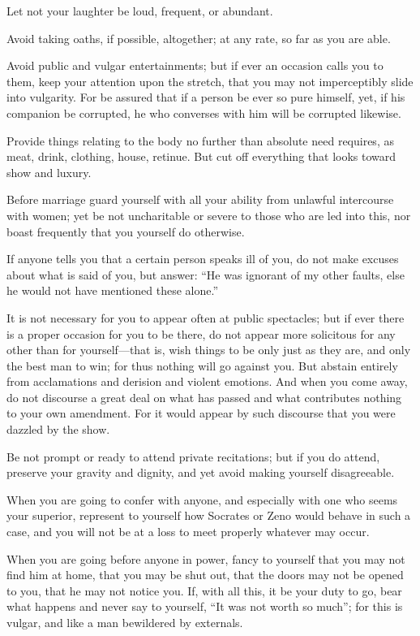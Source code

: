 \documentclass[11pt]{article}
\begin{document}
Let not your laughter be loud, frequent, or abundant.

Avoid taking oaths, if possible, altogether; at any rate, so far as you are able.

Avoid public and vulgar entertainments; but if ever an occasion calls you to them, keep your attention upon the stretch, that you may not imperceptibly slide into vulgarity. For be assured that if a person be ever so pure himself, yet, if his companion be corrupted, he who converses with him will be corrupted likewise.

Provide things relating to the body no further than absolute need requires, as meat, drink, clothing, house, retinue. But cut off everything that looks toward show and luxury.

Before marriage guard yourself with all your ability from unlawful intercourse with women; yet be not uncharitable or severe to those who are led into this, nor boast frequently that you yourself do otherwise.

If anyone tells you that a certain person speaks ill of you, do not make excuses about what is said of you, but answer: “He was ignorant of my other faults, else he would not have mentioned these alone.”

It is not necessary for you to appear often at public spectacles; but if ever there is a proper occasion for you to be there, do not appear more solicitous for any other than for yourself—that is, wish things to be only just as they are, and only the best man to win; for thus nothing will go against you. But abstain entirely from acclamations and derision and violent emotions. And when you come away, do not discourse a great deal on what has passed and what contributes nothing to your own amendment. For it would appear by such discourse that you were dazzled by the show.

Be not prompt or ready to attend private recitations; but if you do attend, preserve your gravity and dignity, and yet avoid making yourself disagreeable.

When you are going to confer with anyone, and especially with one who seems your superior, represent to yourself how Socrates or Zeno would behave in such a case, and you will not be at a loss to meet properly whatever may occur.

When you are going before anyone in power, fancy to yourself that you may not find him at home, that you may be shut out, that the doors may not be opened to you, that he may not notice you. If, with all this, it be your duty to go, bear what happens and never say to yourself, “It was not worth so much”; for this is vulgar, and like a man bewildered by externals.
\end{document}
